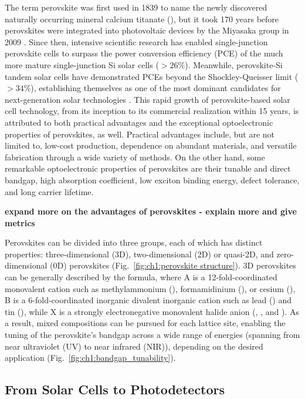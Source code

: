 The term perovskite was first used in 1839 to name the newly discovered naturally occurring mineral calcium titanate (), but it took 170 years before perovskites were integrated into photovoltaic devices by the Miyasaka group in 2009 \cite{Kojima2009OrganometalCells}. Since then, intensive scientific research has enabled single-junction perovskite cells to surpass the power conversion efficiency (PCE) of the much more mature single-junction Si solar cells ($> 26\%$). Meanwhile, perovskite-Si tandem solar cells have demonstrated PCEs beyond the Shockley-Queisser limit ($>34\%$), establishing themselves as one of the most dominant candidates for next-generation solar technologies \cite{Hasan2024StabilityReview, Noman2024ATechnology}. This rapid growth of perovskite-based solar cell technology, from its inception to its commercial realization within 15 years, is attributed to both practical advantages and the exceptional optoelectronic properties of perovskites, as well. Practical advantages include, but are not limited to, low-cost production, dependence on abundant materials, and versatile fabrication through a wide variety of methods. On the other hand, some remarkable optoelectronic properties of perovskites are their tunable and direct bandgap, high absorption coefficient, low exciton binding energy, defect tolerance, and long carrier lifetime. 

\textbf{expand more on the advantages of perovskites - explain more and give metrics}

Perovskites can be divided into three groups, each of which has distinct properties: three-dimensional (3D), two-dimensional (2D) or quasi-2D, and zero-dimensional (0D) perovskites (Fig.~\ref{fig:ch1:perovskite structure}). 3D perovskites can be generally described by the  formula, where A is a 12-fold-coordinated monovalent cation such as methylammonium (), formamidinium (), or cesium (), B is a 6-fold-coordinated inorganic divalent inorganic cation such as lead () and tin (), while X is a strongly electronegative monovalent halide anion (, , and ). As a result, mixed compositions can be pursued for each lattice site, enabling the tuning of the perovskite's bandgap across a wide range of energies (spanning from near ultraviolet (UV) to near infrared (NIR)), depending on the desired application (Fig.~\ref{fig:ch1:bandgap_tunability}).

\subsection{From Solar Cells to Photodetectors}

